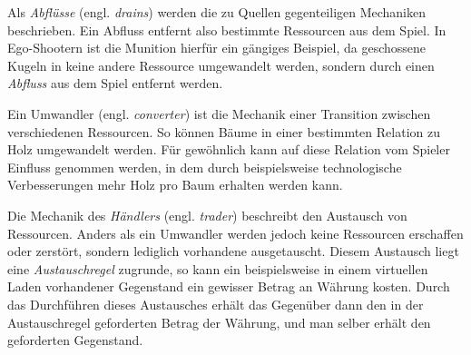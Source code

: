 Als \textit{Abflüsse} (engl. \textit{drains}) werden die zu Quellen gegenteiligen Mechaniken beschrieben. Ein Abfluss entfernt also bestimmte Ressourcen aus dem Spiel. In Ego-Shootern ist die Munition hierfür ein gängiges Beispiel, da geschossene Kugeln in keine andere Ressource umgewandelt werden, sondern durch einen \textit{Abfluss} aus dem Spiel entfernt werden.

Ein Umwandler (engl. \textit{converter}) ist die Mechanik einer Transition zwischen verschiedenen Ressourcen. So können Bäume in einer bestimmten Relation zu Holz umgewandelt werden. Für gewöhnlich kann auf diese Relation vom Spieler Einfluss genommen werden, in dem durch beispielsweise technologische Verbesserungen mehr Holz pro Baum erhalten werden kann.

Die Mechanik des \textit{Händlers} (engl. \textit{trader}) beschreibt den Austausch von Ressourcen. Anders als ein Umwandler werden jedoch keine Ressourcen erschaffen oder zerstört, sondern lediglich vorhandene ausgetauscht. Diesem Austausch liegt eine \textit{Austauschregel} zugrunde, so kann ein beispielsweise in einem virtuellen Laden vorhandener Gegenstand ein gewisser Betrag an Währung kosten. Durch das Durchführen dieses Austausches erhält das Gegenüber dann den in der Austauschregel geforderten Betrag der Währung, und man selber erhält den geforderten Gegenstand.